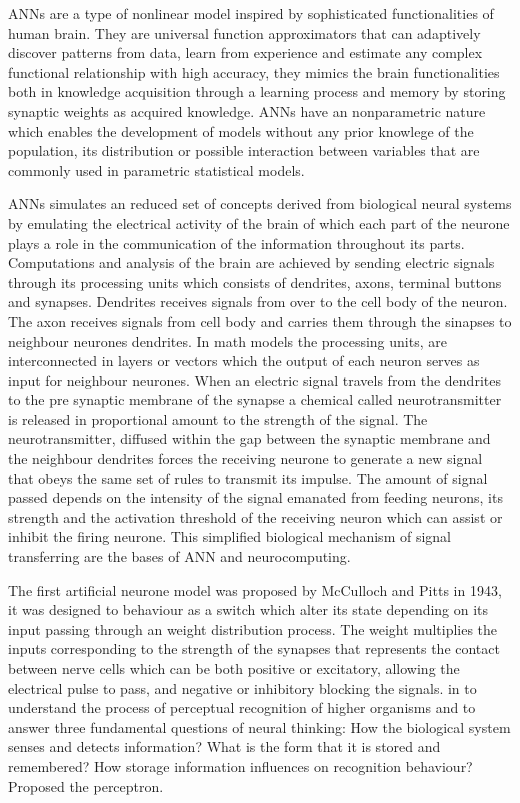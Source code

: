 ANNs are a type of nonlinear model inspired by sophisticated functionalities of human brain. They are universal function approximators that can adaptively discover patterns from data, learn from experience and estimate any complex functional relationship with high accuracy\cite{zhang1998linear, wang2003artificial}, they mimics the brain functionalities both in knowledge acquisition through a learning process and memory by storing synaptic weights as acquired knowledge\cite{ferraudo}. ANNs have an nonparametric nature which enables the development of models without any prior knowlege of the population, its distribution or possible interaction between variables that are commonly used in parametric statistical models.\cite{walczak2019artificial}

ANNs simulates an reduced set of concepts derived from biological neural systems by emulating the electrical activity of the brain of which each part of the neurone plays a role in the communication of the information throughout its parts. Computations and analysis of the brain are achieved by sending electric signals through its processing units which consists of dendrites, axons, terminal buttons and synapses\cite{krogh2008artificial}. Dendrites receives signals from over to the cell body of the neuron. The axon receives signals from cell body and carries them through the sinapses to neighbour neurones dendrites. In math models the processing units, are interconnected in layers or vectors which the output of each neuron serves as input for neighbour neurones. When an electric signal travels from the dendrites to the pre synaptic membrane of the synapse a chemical called neurotransmitter is released in proportional amount to the strength of the signal. The neurotransmitter, diffused within the gap between the synaptic membrane and the neighbour dendrites forces the receiving neurone to generate a new signal that obeys the same set of rules to transmit its impulse\cite{basheer2000artificial}. The amount of signal passed depends on the intensity of the signal emanated from feeding neurons, its strength and the activation threshold of the receiving neuron which can assist or inhibit the firing neurone. This simplified biological mechanism of signal transferring are the bases of ANN and neurocomputing.

The first artificial neurone model was proposed by McCulloch and Pitts in 1943, it was designed to behaviour as a switch which alter its state depending on its input passing through an weight distribution process. The weight multiplies the inputs corresponding to the strength of the synapses that represents the contact between nerve cells \cite{mcculloch1943logical} which can be both positive or excitatory, allowing the electrical pulse to pass, and negative or inhibitory blocking the signals. in \citeyear{rosenblatt1958perceptron} \citeauthor{rosenblatt1958perceptron} to understand the process of perceptual recognition of higher organisms and to answer three fundamental questions of neural thinking: How the biological system senses and detects information? What is the form that it is stored and remembered? How storage information influences on recognition behaviour? Proposed the perceptron.



